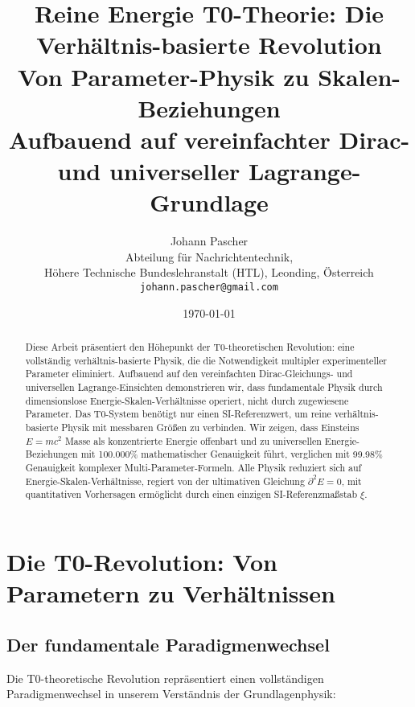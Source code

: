 \documentclass[12pt,a4paper]{article}
\title{Reine Energie T0-Theorie: Die Verhältnis-basierte Revolution \\
	Von Parameter-Physik zu Skalen-Beziehungen \\
	\large Aufbauend auf vereinfachter Dirac- und universeller Lagrange-Grundlage}
\author{Johann Pascher\\
	Abteilung für Nachrichtentechnik, \\Höhere Technische Bundeslehranstalt (HTL), Leonding, Österreich\\
	\texttt{johann.pascher@gmail.com}}
\date{\today}
\newcommand{\Efield}{E}
\newcommand{\xipar}{\xi}
\theoremstyle{definition}
\theoremstyle{remark}
\begin{document}
	
	\maketitle
	
	\begin{abstract}
		Diese Arbeit präsentiert den Höhepunkt der T0-theoretischen Revolution: eine vollständig verhältnis-basierte Physik, die die Notwendigkeit multipler experimenteller Parameter eliminiert. Aufbauend auf den vereinfachten Dirac-Gleichungs- und universellen Lagrange-Einsichten demonstrieren wir, dass fundamentale Physik durch dimensionslose Energie-Skalen-Verhältnisse operiert, nicht durch zugewiesene Parameter. Das T0-System benötigt nur einen SI-Referenzwert, um reine verhältnis-basierte Physik mit messbaren Größen zu verbinden. Wir zeigen, dass Einsteins $E = mc^2$ Masse als konzentrierte Energie offenbart und zu universellen Energie-Beziehungen mit 100.000\% mathematischer Genauigkeit führt, verglichen mit 99.98\% Genauigkeit komplexer Multi-Parameter-Formeln. Alle Physik reduziert sich auf Energie-Skalen-Verhältnisse, regiert von der ultimativen Gleichung $\partial^2 \Efield = 0$, mit quantitativen Vorhersagen ermöglicht durch einen einzigen SI-Referenzmaßstab $\xipar$.
	\end{abstract}
	
	\tableofcontents
	\newpage
	
	\section{Die T0-Revolution: Von Parametern zu Verhältnissen}
	
	\subsection{Der fundamentale Paradigmenwechsel}
	
	Die T0-theoretische Revolution repräsentiert einen vollständigen Paradigmenwechsel in unserem Verständnis der Grundlagenphysik:
	
\end{document}

